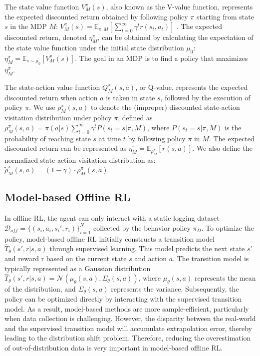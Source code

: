 \documentclass[letterpaper]{article} %
\begin{document}
The state value function \( V_M^\pi(s) \), also known as the V-value function, represents the expected discounted return obtained by following policy \( \pi \) starting from state \( s \) in the MDP \( M \):
\(
V_M^\pi(s) = \mathbb{E}_{\pi, M}\left[\sum_{t=0}^\infty \gamma^t r(s_t, a_t)\right]
\) .
The expected discounted return, denoted \( \eta_M^\pi \), can be obtained by calculating the expectation of the state value function under the initial state distribution \( \mu_0 \):
\(
\eta_M^\pi = \mathbb{E}_{s \sim \mu_0}[V_M^\pi(s)]
\).
The goal in an MDP is to find a policy that maximizes \( \eta_M^\pi \).

The state-action value function \( Q_M^\pi(s, a) \), or Q-value, represents the expected discounted return when action \( a \) is taken in state \( s \), followed by the execution of policy \( \pi \). We use \( \rho_M^\pi(s, a) \) to denote the (improper) discounted state-action visitation distribution under policy \( \pi \), defined as
\(
\rho_M^\pi(s, a) = \pi(a|s) \sum_{t=0}^\infty \gamma^t P(s_t = s | \pi, M)
\),
where \( P(s_t=s | \pi, M) \) is the probability of reaching state \( s \) at time \( t \) by following policy \( \pi \) in \( M \). The expected discounted return can be represented as
\(
\eta_M^\pi = \mathbb{E}_{\rho_M^\pi} \left[ r(s, a) \right]
\).
We also define the normalized state-action visitation distribution as:
\(
\tilde{\rho}_M^\pi(s, a) = (1 - \gamma) \cdot \rho_M^\pi(s, a)
\).

\subsection{Model-based Offline RL}

In offline RL, the agent can only interact with a static logging dataset $\mathcal{D}_{off} = \{(s_i, a_i, s_i', r_i)\}_{i=1}^N$ collected by the behavior policy $\pi_D$. To optimize the policy, model-based offline RL initially constructs a transition model $\hat{T}_{\theta}(s', r|s, a)$ through supervised learning. This model predicts the next state $s'$ and reward r based on the current state $s$ and action $a$. The transition model is typically represented as a Gaussian distribution $\hat{T}_{\theta}(s', r|s, a) = \mathcal{N}(\mu_{\theta}(s, a),\Sigma_{\theta}(s, a))$, where $\mu_{\theta}(s, a)$ represents the mean of the distribution, and $\Sigma_{\theta}(s, a)$ represents the variance. Subsequently, the policy can be optimized directly by interacting with the supervised transition model. As a result, model-based methods are more sample-efficient, particularly when data collection is challenging. However, the disparity between the real-world and the supervised transition model will accumulate extrapolation error, thereby leading to the distribution shift problem. Therefore, reducing the overestimation of out-of-distribution data is very important in model-based offline RL.
\end{document}

